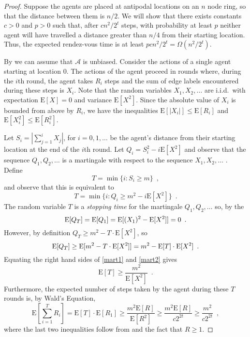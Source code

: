 \documentclass[lotsofwhite]{patmorin}
\newcommand{\E}{\mathrm{E}}
\newcommand{\A}{\mathcal{A}}
\begin{document}
\begin{proof}
Suppose the agents are placed at antipodal locations on an $n$ node ring,
so that the distance between them is $n/2$.  We will show that there
exists constants $c >0$ and $p> 0$ such that, after $cn^2/2^t$ steps,
with probability at least $p$ neither agent will have travelled a
distance greater than $n/4$ from their starting location.  Thus, the
expected rendez-vous time is at least $p cn^2/2^t = \Omega(n^2/2^t)$.

By  we can assume that $\A$ is unbiased.
Consider the actions of a single agent starting at location 0.  The
actions of the agent proceed in rounds where, during the $i$th round,
the agent takes $R_i$ steps and the sum of edge labels encountered
during these steps is $X_i$.  Note that the random variables
$X_1,X_2,\ldots$ are i.i.d.\ with expectation $\E[X]=0$ and variance
$\E[X^2]$. Since the absolute value of $X_i$ is bounded from above by
$R_i$, we have the inequalities $\E[|X_i|]\le \E[R_i]$ and
$\E[X_i^2]\le\E[R_i^2]$. 

Let $S_i=\left|\sum_{j=1}^i X_j\right|$, for
$i=0,1,\ldots$ be the agent's
distance from their starting location at the end of the $i$th round.
Let $Q_i= S_i^2 - i\E[X^2]$ and observe that 
\comment{
\begin{eqnarray*}
 \E\left[Q_{i+1}|X_1,\ldots,X_i\right]
 & = & \sum_{x} \Pr\{X=x\} (\left(S_i + x\right)^2 - (i+1)\E[X^2]) \\
 & = & (S_i)^2 + S_i\E[X] + \E[X^2] - (i+1)\E[X^2] \\
 & = & (S_i)^2 + i\E[X^2] \\
 & = & Q_i  \enspace .
\end{eqnarray*}}
the sequence $Q_1,Q_2,\ldots$ is a martingale with respect to
the sequence $X_1,X_2,\ldots$ \cite[Example 6.1d]{ross}.  Define
\[
    T = \min\{i : S_i \ge m \} \enspace ,
\]
and observe that this is equivalent to 
\[
    T = \min\{i : Q_i \ge m^2 - i\E[X^2] \} \enspace .
\]
The random variable $T$ is a \emph{stopping time} for the martingale
$Q_1,Q_2,\ldots$ so, by the 
\begin{equation}
  \E[Q_T] 
    = \E[Q_1] 
    = \E[(X_1)^2 - \E[X^2]] = 0 \enspace . \eqlabel{mart1}
\end{equation}
However, by definition $Q_T\ge m^2-T\cdot\E[X^2]$, so 
\begin{equation}
  \E[Q_T] 
    \ge \E[m^2 - T\cdot\E[X^2]] 
    = m^2 - \E[T]\cdot\E[X^2] \enspace . \eqlabel{mart2}
\end{equation}
Equating the right hand sides of \eqref{mart1} and \eqref{mart2} gives 
\[
   \E[T] \ge \frac{m^2}{\E[X^2]} \enspace .
\]
Furthermore, the expected number of steps taken by the agent during
these $T$ rounds is, by Wald's Equation, 
\[
  \E\left[\sum_{i=1}^T R_i\right] 
    =  \E[T]\cdot\E[R_1] 
    \ge \frac{m^2 \E[R]}{\E[R^2]} 
    \ge \frac{m^2 \E[R]}{c2^{2t}} 
    \ge \frac{m^2}{c2^{2t}} 
   \enspace ,
\] 
where the last two inequalities follow from  and the
fact that $R\ge 1$.
\end{proof}
\end{document}
